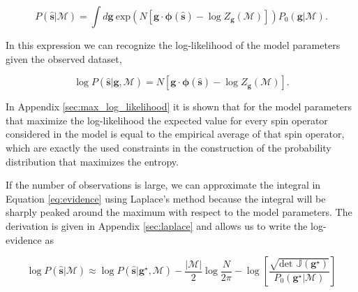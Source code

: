 \begin{equation} \label{eq:evidence}
    P(\mathbf{\hat{s}}|\mathcal{M}) = \int d\mathbf{g} \: \text{exp}\left( N  \left[ \mathbf{g} \cdot \mathbf{\phi}(\mathbf{\hat{s}}) - \log {Z_\mathbf{g}(\mathcal{M})} \right] \right) P_0(\mathbf{g}|\mathcal{M}).
\end{equation}

\noindent
In this expression we can recognize the log-likelihood of the model parameters given the observed dataset,

\begin{equation} \label{eq:log_likelihood}
    \log P(\mathbf{\hat{s}} | \mathbf{g}, \mathcal{M}) = N  \left[ \mathbf{g} \cdot \mathbf{\phi}(\mathbf{\hat{s}}) - \log {Z_\mathbf{g}(\mathcal{M})} \right].
\end{equation}

\noindent
In Appendix \ref{sec:max_log_likelihood} it is shown that for the model parameters that maximize the log-likelihood the expected value for every spin operator considered in the model is equal to the empirical average of that spin operator, which are exactly the used constraints in the construction of the probability distribution that maximizes the entropy.

If the number of observations is large, we can approximate the integral in Equation \ref{eq:evidence} using Laplace's method because the integral will be sharply peaked around the maximum with respect to the model parameters.
The derivation is given in Appendix \ref{sec:laplace} and allows us to write the log-evidence as

\begin{equation}
    \log P(\mathbf{\hat{s}}|\mathcal{M}) \approx \log P(\mathbf{\hat{s}} | \mathbf{g}^\star, \mathcal{M}) -  \frac{|\mathcal{M}|}{2} \log \frac{N}{2 \pi} - \log \left[ \frac{\sqrt{\text{det } \mathbb{J}(\mathbf{g}^\star)}}{P_0(\mathbf{g}^\star|\mathcal{M})} \right]
\end{equation}


